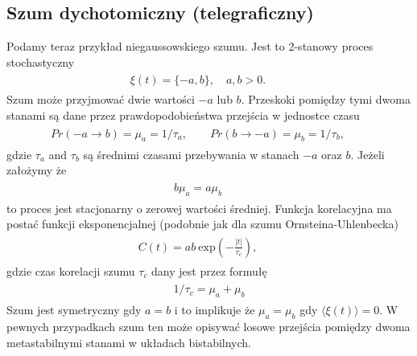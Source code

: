 \documentclass[a4paper,12pt,polish]{sphinxmanual}
\begin{document}
\subsection{Szum dychotomiczny (telegraficzny)}
\label{ch3/chIII031:szum-dychotomiczny-telegraficzny}
Podamy teraz przykład niegaussowskiego szumu. Jest to 2-stanowy proces stochastyczny
\label{ch3/chIII031:equation-eqn23}\begin{gather}
\begin{split}\xi(t) = \{-a, b\}, \quad a, b > 0. \qquad\end{split}\label{ch3/chIII031-eqn23}
\end{gather}
Szum może przyjmować dwie wartości $-a$ lub $b$. Przeskoki pomiędzy tymi dwoma stanami są dane przez prawdopodobieństwa przejścia w jednostce czasu
\label{ch3/chIII031:equation-eqn24}\begin{gather}
\begin{split}Pr(-a\rightarrow b)=\mu_a = 1/\tau_a, \qquad Pr(b\rightarrow -a)=\mu_b = 1/\tau_b, \qquad\end{split}\label{ch3/chIII031-eqn24}
\end{gather}
gdzie $\tau _a$ and $\tau _b$ są średnimi czasami przebywania w stanach $-a$ oraz $b$. Jeżeli założymy że
\label{ch3/chIII031:equation-eqn25}\begin{gather}
\begin{split}b \mu_a= a \mu_b \qquad\end{split}\label{ch3/chIII031-eqn25}
\end{gather}
to proces jest stacjonarny o zerowej wartości średniej. Funkcja korelacyjna ma postać funkcji eksponencjalnej (podobnie jak dla szumu Ornsteina-Uhlenbecka)
\label{ch3/chIII031:equation-eqn26}\begin{gather}
\begin{split}C(t) = a b \:\mbox{exp}\left(-\frac{|t|}{\tau_c} \right), \qquad\end{split}\label{ch3/chIII031-eqn26}
\end{gather}
gdzie czas korelacji szumu $\tau_c$ dany jest przez formułę
\label{ch3/chIII031:equation-eqn27}\begin{gather}
\begin{split}1/\tau_c = \mu_a + \mu_b\end{split}\label{ch3/chIII031-eqn27}
\end{gather}
Szum jest symetryczny gdy $a=b$ i to implikuje że $\mu_a=\mu_b$ gdy $\langle \xi(t) \rangle = 0$. W pewnych przypadkach szum ten może opisywać losowe przejścia pomiędzy dwoma metastabilnymi stanami w układach bistabilnych.
\end{document}
